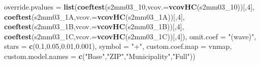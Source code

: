 \documentclass[
]{article}
\newenvironment{Shaded}{\begin{snugshade}}{\end{snugshade}}
\newcommand{\DataTypeTok}[1]{\textcolor[rgb]{0.13,0.29,0.53}{#1}}
\newcommand{\DecValTok}[1]{\textcolor[rgb]{0.00,0.00,0.81}{#1}}
\newcommand{\FloatTok}[1]{\textcolor[rgb]{0.00,0.00,0.81}{#1}}
\newcommand{\KeywordTok}[1]{\textcolor[rgb]{0.13,0.29,0.53}{\textbf{#1}}}
\newcommand{\NormalTok}[1]{#1}
\newcommand{\StringTok}[1]{\textcolor[rgb]{0.31,0.60,0.02}{#1}}
\begin{document}
\begin{Shaded}
\begin{Highlighting}[]
          \DataTypeTok{override.pvalues =} \KeywordTok{list}\NormalTok{(}\KeywordTok{coeftest}\NormalTok{(s2mm03_}\DecValTok{10}\NormalTok{,}\DataTypeTok{vcov.=}\KeywordTok{vcovHC}\NormalTok{(s2mm03_}\DecValTok{10}\NormalTok{))[,}\DecValTok{4}\NormalTok{],}
                                  \KeywordTok{coeftest}\NormalTok{(s2mm03_1A,}\DataTypeTok{vcov.=}\KeywordTok{vcovHC}\NormalTok{(s2mm03_1A))[,}\DecValTok{4}\NormalTok{],}
                                  \KeywordTok{coeftest}\NormalTok{(s2mm03_1B,}\DataTypeTok{vcov.=}\KeywordTok{vcovHC}\NormalTok{(s2mm03_1B))[,}\DecValTok{4}\NormalTok{],}
                                  \KeywordTok{coeftest}\NormalTok{(s2mm03_1C,}\DataTypeTok{vcov.=}\KeywordTok{vcovHC}\NormalTok{(s2mm03_1C))[,}\DecValTok{4}\NormalTok{]),}
          \DataTypeTok{omit.coef =} \StringTok{"(wave)"}\NormalTok{, }\DataTypeTok{stars =} \KeywordTok{c}\NormalTok{(}\FloatTok{0.1}\NormalTok{,}\FloatTok{0.05}\NormalTok{,}\FloatTok{0.01}\NormalTok{,}\FloatTok{0.001}\NormalTok{), }\DataTypeTok{symbol =} \StringTok{"+"}\NormalTok{,}
          \DataTypeTok{custom.coef.map =}\NormalTok{ vnmap, }
          \DataTypeTok{custom.model.names =} \KeywordTok{c}\NormalTok{(}\StringTok{"Base"}\NormalTok{,}\StringTok{"ZIP"}\NormalTok{,}\StringTok{"Municipality"}\NormalTok{,}\StringTok{"Full"}\NormalTok{))}
\end{Highlighting}
\end{Shaded}
\end{document}

